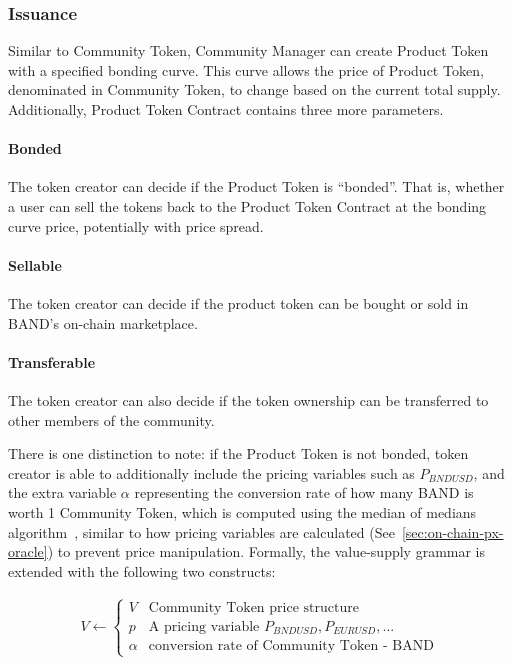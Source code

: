 \documentclass[letterpaper,11pt]{article}
\begin{document}
\subsubsection{Issuance}
Similar to Community Token, Community Manager can create Product Token with a specified bonding curve. This curve allows the price of Product Token, denominated in Community Token, to change based on the current total supply. Additionally, Product Token Contract contains three more parameters.

\paragraph{Bonded} The token creator can decide if the Product Token is ``bonded''. That is, whether a user can sell the tokens back to the Product Token Contract at the bonding curve price, potentially with price spread.

\paragraph{Sellable} The token creator can decide if the product token can be bought or sold in BAND's on-chain marketplace.

\paragraph{Transferable} The token creator can also decide if the token ownership can be transferred to other members of the community.

There is one distinction to note: if the Product Token is not bonded, token creator is able to additionally include the pricing variables such as $P_{\mathit{BNDUSD}}$, and the extra variable $\alpha$ representing the conversion rate of how many BAND is worth 1 Community Token, which is computed using the median of medians algorithm~\cite{wiki:mom}, similar to how pricing variables are calculated (See~\cref{sec:on-chain-px-oracle}) to prevent price manipulation. Formally, the value-supply grammar is extended with the following two constructs:

\begin{align*}
V \leftarrow
\begin{cases}
V & \text{Community Token price structure} \\
p & \text{A pricing variable $P_{\mathit{BNDUSD}}, P_{EURUSD}, ...$} \\
\alpha & \text{conversion rate of Community Token - BAND}
\end{cases}
\end{align*}
\end{document}
